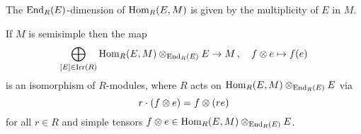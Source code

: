 \begin{corollary}
  \label{corollary: dimension of multiplicity space is multiplicity}
  The $\operatorname{End}_R(E)$-dimension of $\operatorname{Hom}_R(E,M)$ is given by the multiplicity of $E$ in $M$.
\end{corollary}


\begin{corollary}
  If $M$ is semisimple then the map
  \[
            \bigoplus_{[E] \in \operatorname{Irr}(R)} \operatorname{Hom}_R(E, M) \mathbin{\otimes}_{\operatorname{End}_R(E)} E
    \to     M \,,
    \quad   f \mathbin{\otimes} e
    \mapsto f(e)
  \]
  is an isomorphism of $R$-modules, where $R$ acts on $\operatorname{Hom}_R(E, M) \mathbin{\otimes}_{\operatorname{End}_R(E)} E$ via
  \[
      r \cdot (f \mathbin{\otimes} e)
    = f \mathbin{\otimes} (re)
  \]
  for all $r \in R$ and simple tensors $f \mathbin{\otimes} e \in \operatorname{Hom}_R(E, M) \mathbin{\otimes}_{\operatorname{End}_R(E)} E$.
\end{corollary}




